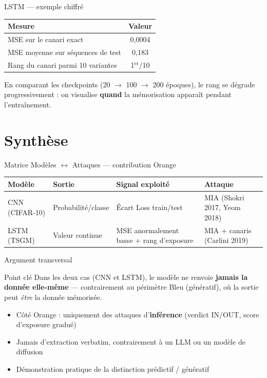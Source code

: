 \documentclass[11pt]{beamer}
\begin{document}
\begin{frame}{LSTM --- exemple chiffré}
  \begin{table}
  \centering
  \begin{tabular}{lc}
    \toprule
    \textbf{Mesure} & \textbf{Valeur} \\
    \midrule
    MSE sur le canari exact & 0{,}0004 \\
    MSE moyenne sur séquences de test & 0{,}183 \\
    Rang du canari parmi 10 variantes & 1$^{\text{er}}$/10 \\
    \bottomrule
  \end{tabular}
  \end{table}
  \vspace{3mm}
  En comparant les checkpoints (20 $\to$ 100 $\to$ 200 époques), le
  rang se dégrade progressivement : on visualise \textbf{quand}
  la mémorisation apparaît pendant l'entraînement.
\end{frame}

\section{Synthèse}

\begin{frame}{Matrice Modèles $\leftrightarrow$ Attaques --- contribution Orange}
  \begin{table}
  \centering
  \scriptsize
  \begin{tabular}{p{2.4cm}p{2.2cm}p{2.6cm}p{2.2cm}}
    \toprule
    \textbf{Modèle} & \textbf{Sortie} & \textbf{Signal exploité} & \textbf{Attaque} \\
    \midrule
    CNN (CIFAR-10) & Probabilité/classe & Écart Loss train/test & MIA (Shokri 2017, Yeom 2018) \\
    LSTM (TSGM) & Valeur continue & MSE anormalement basse + rang d'exposure & MIA + canaris (Carlini 2019) \\
    \bottomrule
  \end{tabular}
  \end{table}
\end{frame}

\begin{frame}{Argument transversal}
  \begin{alertblock}{Point clé}
    Dans les deux cas (CNN et LSTM), le modèle ne renvoie
    \textbf{jamais la donnée elle-même} --- contrairement au
    périmètre Bleu (génératif), où la sortie peut \emph{être}
    la donnée mémorisée.
  \end{alertblock}
  \begin{itemize}
    \item Côté Orange : uniquement des attaques d'\textbf{inférence}
          (verdict IN/OUT, score d'exposure gradué)
    \item Jamais d'extraction verbatim, contrairement à un LLM ou
          un modèle de diffusion
    \item Démonstration pratique de la distinction prédictif / génératif
  \end{itemize}
\end{frame}
\end{document}

